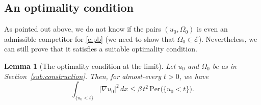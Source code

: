 \documentclass[11pt]{article}
\numberwithin{equation}{section}
\newcommand{\Per}{\mathrm{Per}}
\theoremstyle{plain}
\newtheorem{lemma}[teo]{Lemma}
\theoremstyle{definition}
\begin{document}
\subsection{An optimality condition}
As pointed out above, we do not know if the pairs $(u_0,\Omega_0)$ is even an admissible competitor for \eqref{e:pb} (we need to show that $\Omega_0\in \mathcal E$). Nevertheless, we can still prove that it satisfies a suitable optimality condition.
\begin{lemma}[The optimality condition at the limit]\label{l:opt_cond}
Let $u_0$ and $\Omega_0$ be as in Section~\ref{sub:construction}. Then, for almost-every $t>0$, we have
\begin{equation}\label{e:opt_cond}
\int_{\{u_0<t\}}|\nabla u_0|^2\,dx\le \beta\, t^2\, \Per\big(\{u_0<t\}\big).
\end{equation}
\end{lemma}
\end{document}

